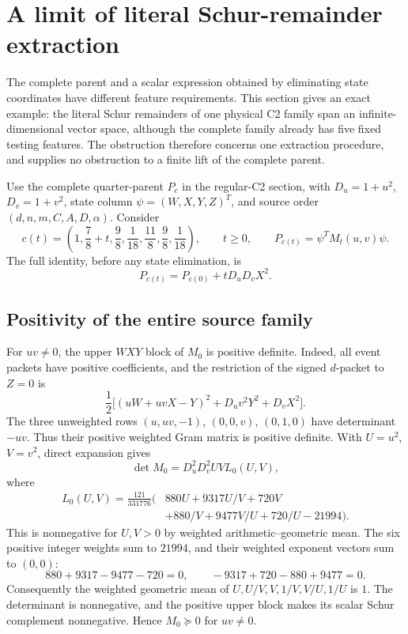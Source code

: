\section{A limit of literal Schur-remainder extraction}
\label{sec:schur-remainder}

The complete parent and a scalar expression obtained by eliminating state
coordinates have different feature requirements. This section gives an exact
example: the literal Schur remainders of one physical C2 family span an
infinite-dimensional vector space, although the complete family already has
five fixed testing features. The obstruction therefore concerns one extraction
procedure, and supplies no obstruction to a finite lift of the complete parent.

Use the complete quarter-parent $P_c$ in the regular-C2 section, with
$D_u=1+u^2$, $D_v=1+v^2$, state column
$\psi=(W,X,Y,Z)^T$, and source order $(d,n,m,C,A,D,\alpha)$.
Consider
\[
 c(t)=\left(1,\frac78+t,\frac98,\frac1{18},
                  \frac{11}8,\frac98,\frac1{18}\right),
 \qquad t\geq0,
 \qquad P_{c(t)}=\psi^TM_t(u,v)\psi.
\]
The full identity, before any state elimination, is
\begin{equation}
 P_{c(t)}=P_{c(0)}+tD_uD_vX^2.
 \label{eq:schur-parent-increment}
\end{equation}

\subsection{Positivity of the entire source family}

For $uv\ne0$, the upper $WXY$ block of $M_0$ is positive definite.
Indeed, all event packets have positive coefficients, and the restriction of
the signed $d$-packet to $Z=0$ is
\[
 \frac12\bigl[(uW+uvX-Y)^2+D_uv^2Y^2+D_vX^2\bigr].
\]
The three unweighted rows $(u,uv,-1)$, $(0,0,v)$, $(0,1,0)$ have
determinant $-uv$. Thus their positive weighted Gram matrix is positive
definite. With $U=u^2$, $V=v^2$, direct expansion gives
\[
 \det M_0=D_u^2D_v^2UV L_0(U,V),
\]
where
\begin{equation}
\begin{split}
 L_0(U,V)=\frac{121}{331776}\bigl(&880U+9317U/V+720V\\
                  &+880/V+9477V/U+720/U-21994\bigr).
\end{split}
\label{eq:seed-laurent}
\end{equation}
This is nonnegative for $U,V>0$ by weighted arithmetic--geometric mean.
The six positive integer weights sum to $21994$, and their weighted
exponent vectors sum to $(0,0)$:
\[
 880+9317-9477-720=0,
 \qquad -9317+720-880+9477=0.
\]
Consequently the weighted geometric mean of
$U,U/V,V,1/V,V/U,1/U$ is $1$. The determinant is nonnegative, and
the positive upper block makes its scalar Schur complement nonnegative.
Hence $M_0\succeq0$ for $uv\ne0$.

